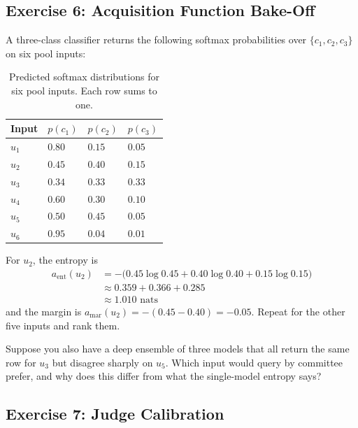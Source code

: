 \subsection{Exercise 6: Acquisition Function Bake-Off}

A three-class classifier returns the following softmax probabilities over $\{c_1, c_2, c_3\}$ on six pool inputs:

\begin{table}[ht]
\centering
\begin{tabular}{p{}p{}p{}p{}}
    \toprule
    \textbf{Input} & \textbf{$p(c_1)$} & \textbf{$p(c_2)$} & \textbf{$p(c_3)$} \\
    \midrule
    $u_1$ & $0.80$ & $0.15$ & $0.05$ \\
    $u_2$ & $0.45$ & $0.40$ & $0.15$ \\
    $u_3$ & $0.34$ & $0.33$ & $0.33$ \\
    $u_4$ & $0.60$ & $0.30$ & $0.10$ \\
    $u_5$ & $0.50$ & $0.45$ & $0.05$ \\
    $u_6$ & $0.95$ & $0.04$ & $0.01$ \\
    \bottomrule
\end{tabular}
\vspace{2em}
\caption{Predicted softmax distributions for six pool inputs. Each row sums to one.}
\label{tab:al_pool}
\end{table}

 For $u_2$, the entropy is
\begin{align*}
    a_{\text{ent}}(u_2) &= -\bigl(0.45 \log 0.45 + 0.40 \log 0.40 + 0.15 \log 0.15\bigr) \\
                        &\approx 0.359 + 0.366 + 0.285 \\
                        &\approx 1.010 \text{ nats}
\end{align*}
and the margin is $a_{\text{mar}}(u_2) = -(0.45 - 0.40) = -0.05$. Repeat for the other five inputs and rank them.

 Suppose you also have a deep ensemble of three models that all return the same row for $u_3$ but disagree sharply on $u_5$. Which input would query by committee prefer, and why does this differ from what the single-model entropy says?

\subsection{Exercise 7: Judge Calibration}

